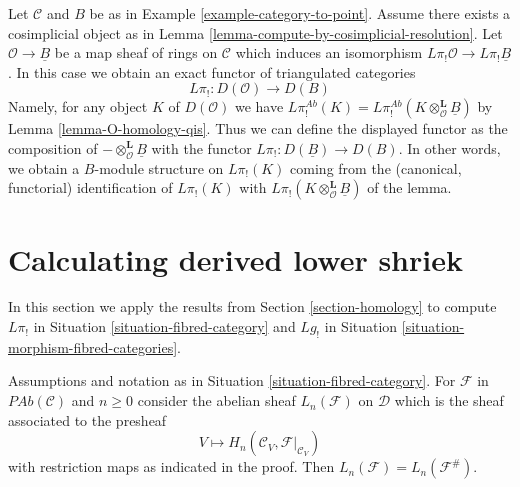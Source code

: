 \begin{remark}
\label{remark-O-homology-B-homology-general}
Let $\mathcal{C}$ and $B$ be as in Example \ref{example-category-to-point}.
Assume there exists a cosimplicial object as in
Lemma \ref{lemma-compute-by-cosimplicial-resolution}.
Let $\mathcal{O} \to \underline{B}$ be a map sheaf of rings on
$\mathcal{C}$ which induces an isomorphism
$L\pi_!\mathcal{O} \to L\pi_!\underline{B}$.
In this case we obtain an exact functor of triangulated categories
$$
L\pi_! : D(\mathcal{O}) \longrightarrow D(B)
$$
Namely, for any object $K$ of $D(\mathcal{O})$ we have
$L\pi^{\textit{Ab}}_!(K) =
L\pi^{\textit{Ab}}_!(K \otimes_{\mathcal{O}}^\mathbf{L} \underline{B})$
by Lemma \ref{lemma-O-homology-qis}.
Thus we can define the displayed functor as the composition of
$- \otimes^\mathbf{L}_\mathcal{O} \underline{B}$ with the functor
$L\pi_! : D(\underline{B}) \to D(B)$.
In other words, we obtain a $B$-module structure on $L\pi_!(K)$ coming
from the (canonical, functorial) identification of $L\pi_!(K)$ with
$L\pi_!(K \otimes_\mathcal{O}^\mathbf{L} \underline{B})$ of the lemma.
\end{remark}







\section{Calculating derived lower shriek}
\label{section-calculate}

\noindent
In this section we apply the results from
Section \ref{section-homology}
to compute
$L\pi_!$ in Situation \ref{situation-fibred-category} and
$Lg_!$ in Situation \ref{situation-morphism-fibred-categories}.

\begin{lemma}
\label{lemma-compute-left-derived-pi-shriek-pre}
Assumptions and notation as in Situation \ref{situation-fibred-category}.
For $\mathcal{F}$ in $\textit{PAb}(\mathcal{C})$ and $n \geq 0$
consider the abelian sheaf $L_n(\mathcal{F})$ on $\mathcal{D}$
which is the sheaf associated to the presheaf
$$
V \longmapsto H_n(\mathcal{C}_V, \mathcal{F}|_{\mathcal{C}_V})
$$
with restriction maps as indicated in the proof. Then
$L_n(\mathcal{F}) = L_n(\mathcal{F}^\#)$.
\end{lemma}

